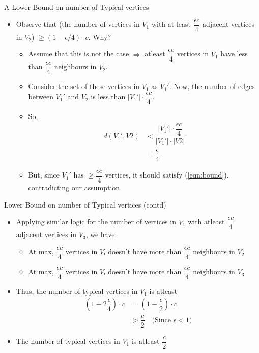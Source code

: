 \documentclass[10pt]{beamer}
\begin{document}
\begin{frame}{A Lower Bound on number of Typical vertices}
    \begin{itemize}
        \item Observe that (the number of vertices in $V_1$ with at least $\dfrac{\epsilon c}{4}$ adjacent vertices in $V_2$) $\geq (1-\epsilon/4)\cdot c$. Why? \begin{itemize}
            \item Assume that this is not the case $\Rightarrow$ atleast $\dfrac{\epsilon c}{4}$ vertices in $V_1$ have less than $\dfrac{\epsilon c}{4}$ neighbours in $V_2$. 
            \item Consider the set of these vertices in $V_1$ as $V_1'$. Now, the number of edges between $V_1'$ and $V_2$ is less than $|V_1'|\cdot \dfrac{\epsilon c}{4}$.
            \item So, \begin{align}
                d(V_1', V2) &< \dfrac{|V_1'|\cdot \dfrac{\epsilon c}{4}}{|V_1'|\cdot|V2|} \\
                &=\dfrac{\epsilon}{4}
            \end{align}
            \item But, since $V_1'$ has $\geq \dfrac{\epsilon c}{4}$ vertices, it should satisfy (\ref{eqn:bound}), contradicting our assumption
        \end{itemize}
    \end{itemize}
\end{frame}
\begin{frame}{Lower Bound on number of Typical vertices (contd)}
\begin{itemize}
    \item Applying similar logic for the number of vertices in $V_1$ with atleast $\dfrac{\epsilon c}{4}$ adjacent vertices in $V_3$, we have: \begin{itemize}
        \item At max, $\dfrac{\epsilon c}{4}$ vertices in $V_!$ doesn't have more than $\dfrac{\epsilon c}{4}$ neighbours in $V_2$
        \item At max, $\dfrac{\epsilon c}{4}$ vertices in $V_!$ doesn't have more than $\dfrac{\epsilon c}{4}$ neighbours in $V_3$
    \end{itemize}
    \item Thus, the number of typical vertices in $V_1$ is atleast 
    \begin{align}
        (1-2\dfrac{\epsilon}{4})\cdot c &= (1-\dfrac{\epsilon}{2})\cdot c \\
        &>\dfrac{c}{2} \quad \text{(Since $\epsilon < 1$)}
    \end{align}
    \item The number of typical vertices in $V_1$ is atleast $\dfrac{c}{2}$
\end{itemize}
\end{frame}
\end{document}
